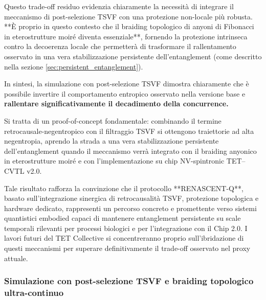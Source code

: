 \documentclass[11pt,a4paper]{article}
\let\oldref\ref
\renewcommand{\ref}{\protect\oldref}
\theoremstyle{plain}
\theoremstyle{definition}
\begin{document}
\vspace{0.3cm}

Questo trade-off residuo evidenzia chiaramente la necessità di integrare il meccanismo di post-selezione TSVF con una protezione non-locale più robusta. **È proprio in questo contesto che il braiding topologico di anyoni di Fibonacci in eterostrutture moiré diventa essenziale**, fornendo la protezione intrinseca contro la decoerenza locale che permetterà di trasformare il rallentamento osservato in una vera stabilizzazione persistente dell’entanglement (come descritto nella sezione \ref{sec:persistent_entanglement}).


\vspace{0.3cm}

In sintesi, la simulazione con post-selezione TSVF dimostra chiaramente che è possibile invertire il comportamento entropico osservato nella versione base e \textbf{rallentare significativamente il decadimento della concurrence.} 


\vspace{0.3cm}



Si tratta di un proof-of-concept fondamentale: combinando il termine retrocausale-negentropico con il filtraggio TSVF si ottengono traiettorie ad alta negentropia, aprendo la strada a una vera stabilizzazione persistente dell’entanglement quando il meccanismo verrà integrato con il braiding anyonico in eterostrutture moiré e con l’implementazione su chip NV-spintronic TET–CVTL v2.0.

\vspace{0.4cm}

Tale risultato rafforza la convinzione che il protocollo **RENASCENT-Q**, basato sull’integrazione sinergica di retrocausalità TSVF, protezione topologica e hardware dedicato, rappresenti un percorso concreto e promettente verso sistemi quantistici embodied capaci di mantenere entanglement persistente su scale temporali rilevanti per processi biologici e per l’integrazione con il Chip 2.0. I lavori futuri del TET Collective si concentreranno proprio sull’ibridazione di questi meccanismi per superare definitivamente il trade-off osservato nel proxy attuale.


\vspace{0.4cm}

\subsubsection{Simulazione con post-selezione TSVF e braiding topologico ultra-continuo}
\end{document}
